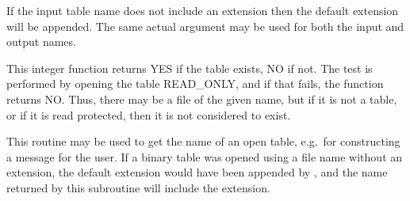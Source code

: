 \begin{callseq}
\end{callseq}

If the input table name does not include an extension
then the default extension will be appended.
The same actual argument may be used for both the input and output names.

\callseqtable

\begin{callseq}
\end{callseq}

This integer function returns YES if the table exists, NO if not.
The test is performed by opening the table READ\_ONLY,
and if that fails, the function returns NO.
Thus, there may be a file of the given name,
but if it is not a table, or if it is read protected,
then it is not considered to exist.

\callseqfcn

\begin{callseq}
\end{callseq}

This routine may be used to get the name of an open table,
e.g.~for constructing a message for the user.
If a binary table was opened using a file name without an extension,
the default extension would have been appended by ,
and the name returned by this subroutine will include the extension.

\callseqtable


